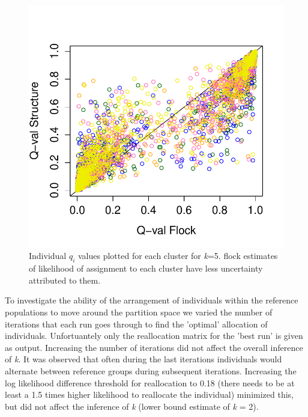 \begin{figure}
\begin{center}
 \includegraphics[width=\textwidth]{images/Figures-Pat/Qval-1plot.pdf}
    \caption{Individual \textit{$q_i$} values plotted for each cluster for \textit{k}=5. 
{\sc flock} estimates of likelihood of assignment to each cluster have less uncertainty
 attributed to them.}
    \label{Fig.2}
\end{center}
\end{figure}


To investigate the ability of the arrangement of individuals within the reference 
populations to move around the partition space we varied the number of iterations that 
each run goes through to find the 'optimal' allocation of individuals. Unfortuantely 
only the reallocation matrix for the 'best run' is given as output. Increasing the 
number of iterations did not affect the overall inference of \textit{k}. It was 
observed that often during the last iterations individuals would alternate between 
reference groups during subsequent iterations. Increasing the log likelihood 
difference threshold for reallocation to 0.18 (there needs to be at least a 1.5 times 
higher likelihood to reallocate the individual) minimized this, but did not affect the 
inference of \textit{k} (lower bound estimate of \textit{k} = 2). 


